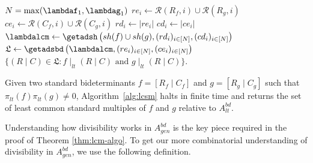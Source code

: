 \documentclass[11pt,reqno]{amsart}
\newcommand{\suchthat}{:}
\newcommand{\bitab}[2]{[#1\;|\;#2]}
\newcommand{\bidet}[2]{(#1\;|\;#2)}
\newcommand{\ltdivides}{\mid_{lt}}
\newcommand{\lcmlt}{LCM_{sm}^{lt}}
\newcommand{\shapetab}[1]{sh(#1)}
\theoremstyle{definition}
\numberwithin{equation}{section}
\begin{document}
\begin{algorithm}%
\caption{Algorithm to compute $\lcmlt(\cdot)$ for a specific $A_{lt}$}
\label{alg:lcsm}
\begin{algorithmic}[1]
\Require{Bitableau $f = \bitab{R_f}{C_f}$, $g = \bitab{R_g}{C_g}$, with $\shapetab{f} = (\lambdaf_1, \ldots, \lambdaf_r)$, $\shapetab{g} = (\lambdag_1, \ldots, \lambdag_s)$}
\medskip
\State $N = \max(\lambdaf_1, \lambdag_1)$ \label{line:N}
	\State $re_i \gets \mathcal{R}(R_f, i) \cup \mathcal{R}(R_g, i)$  \label{line:re}
	\State $ce_i \gets \mathcal{R}(C_f, i) \cup \mathcal{R}(C_g, i)$  \label{line:ce}
	\State $rd_i \gets |re_i|$ \label{line:rd}
	\State $cd_i \gets |ce_i|$ \label{line:cd}
\EndFor
\medskip
\State $\lambdalcm \gets \getadsh\left(\shapetab{f} \cup \shapetab{g}, (rd_i)_{i \in [N]}, (cd_i)_{i \in [N]}\right)$ \label{line:admissible-shapes}
\medskip
\State $\mathfrak{L} \gets \getadsbd\left(\lambdalcm, (re_i)_{i \in [N]}, (ce_i)_{i \in [N]}\right)$  \label{line:admissible-sbd}
\State \Return $\{\bidet{R}{C} \in \mathfrak{L} \suchthat f \ltdivides \bidet{R}{C} \text{ and } g \ltdivides \bidet{R}{C}\}$. \label{line:check-divides}
\end{algorithmic}
\end{algorithm}

\begin{theorem}[store=thmlcmalgo]
\label{thm:lcm-algo}
Given two standard bideterminants $f = \bitab{R_f}{C_f}$ and $g = \bitab{R_g}{C_g}$ such that $\pi_{lt}(f)\pi_{lt}(g) \neq 0$, Algorithm~\ref{alg:lcsm} halts in finite time and returns the set of least common standard multiples of $f$ and $g$ relative to $A_{lt}^{bd}$.
\end{theorem}

Understanding how divisibility works in $A^{bd}_{gen}$ is the key piece required in the proof of Theorem \ref{thm:lcm-algo}. To get our more combinatorial understanding of divisibility in $A^{bd}_{gen}$, we use the following definition.

\end{document}
